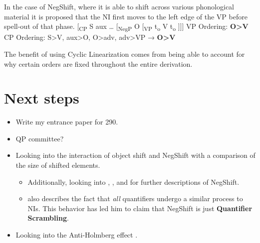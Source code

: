 \documentclass[12pt, letterpaper]{article}
\begin{document}
\ex In the case of NegShift, where it is able to shift across various phonological material it is proposed that the NI first moves to the left edge of the VP before spell-out of that phase. 
\vspace{6pt}
	\ea {}[\textsubscript{CP} S aux … [\textsubscript{NegP} O [\textsubscript{VP} t\textsubscript{o}  V t\textsubscript{o} ]]]
	\ex VP Ordering: \textbf{O>V}\\
	CP Ordering: S>V, aux>O, O>adv, adv>VP → \textbf{O>V}
	\z

\ex The benefit of using Cyclic Linearization comes from being able to account for why certain orders are fixed throughout the entire derivation.
\z 


\section{Next steps} \label{sec:NEXT}
\begin{itemize}
	\item Write my entrance paper for 290.
	\item QP committee?
	\item Looking into the interaction of object shift and NegShift with a comparison of the size of shifted elements.
	\begin{itemize}
		\item Additionally, looking into \citet{christensenInterfacesNegationSyntax2005}, \citet{viknerObjectShiftScandinavian2017,viknerVerbMovementVariation2001}, and \citet{thrainssonSyntaxIcelandic2010} for further descriptions of NegShift.
		\item \citeauthor{thrainssonSyntaxIcelandic2010} also describes the fact that \emph{all} quantifiers undergo a similar process to NIs. This behavior has led him to claim that NegShift is just \textbf{Quantifier Scrambling}.
	\end{itemize}
	\item Looking into the Anti-Holmberg effect \citep{foxCyclicLinearizationSyntactic2005,engelsScandinavianNegativeIndefinites2012}.
\end{itemize}



\printbibliography[heading=bibintoc]
\end{document}
